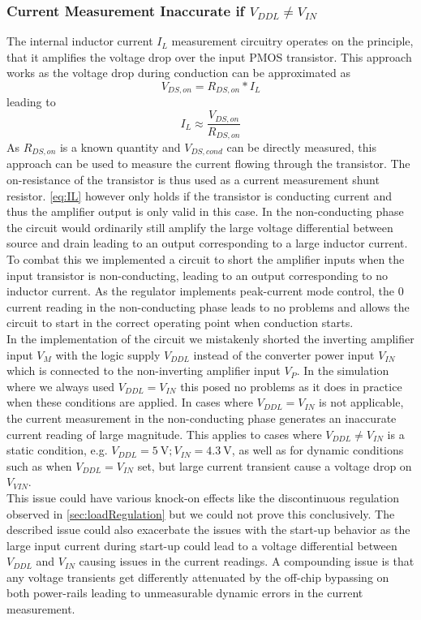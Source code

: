 \subsubsection{Current Measurement Inaccurate if $V_{DDL} \neq V_{IN}$}
\label{subsubsec:cur_mes_inac}
The internal inductor current $I_L$ measurement circuitry operates on the principle, that it amplifies the voltage drop over the input PMOS transistor. This approach works as the voltage drop during conduction can be approximated as 
\begin{equation}
    V_{DS,on} = R_{DS,on} * I_L
\end{equation}
\label{eq:Vds}
leading to 
\begin{equation}
    I_L \approx \frac{V_{DS,on}}{R_{DS,on}}
\end{equation}
\label{eq:IL}
As $R_{DS,on}$ is a known quantity and $V_{DS,cond}$ can be directly measured, this approach can be used to measure the current flowing through the transistor.
The on-resistance of the transistor is thus used as a current measurement shunt resistor. \autoref{eq:IL} however only holds if the transistor is conducting current and thus the amplifier output is only valid in this case. In the non-conducting phase the circuit would ordinarily still amplify the large voltage differential between source and drain leading to an output corresponding to a large inductor current. To combat this we implemented a circuit to short the amplifier inputs when the input transistor is non-conducting, leading to an output corresponding to no inductor current. As the regulator implements peak-current mode control, the 0 current reading in the non-conducting phase leads to no problems and allows the circuit to start in the correct operating point when conduction starts. \\
In the implementation of the circuit we mistakenly shorted the inverting amplifier input $V_M$ with the logic supply $V_{DDL}$ instead of the converter power input $V_{IN}$ which is connected to the non-inverting amplifier input $V_P$. In the simulation where we always used $V_{DDL} = V_{IN}$ this posed no problems as it does in practice when these conditions are applied. In cases where $V_{DDL} = V_{IN}$ is not applicable, the current measurement in the non-conducting phase generates an inaccurate current reading of large magnitude. This applies to cases where $V_{DDL} \neq V_{IN}$ is a static condition, e.g. $V_{DDL} = \qty{5}{\volt}; V_{IN}= \qty{4.3}{\volt}$, as well as for dynamic conditions such as when $V_{DDL} = V_{IN}$ set, but large current transient cause a voltage drop on $V_{VIN}$.\\
This issue could have various knock-on effects like the discontinuous regulation observed in \autoref{sec:loadRegulation} but we could not prove this conclusively. The described issue could also exacerbate the issues with the start-up behavior as the large input current during start-up could lead to a voltage differential between $V_{DDL}$ and $V_{IN}$ causing issues in the current readings. A compounding issue is that any voltage transients get differently attenuated by the off-chip bypassing on both power-rails leading to unmeasurable dynamic errors in the current measurement.

